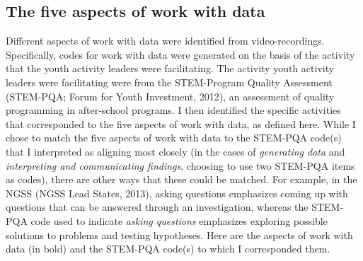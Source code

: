 \documentclass[]{msu-thesis}
\theoremstyle{definition}
\theoremstyle{definition}
\theoremstyle{definition}
\theoremstyle{remark}
\begin{document}
\begin{table}

\caption{\label{tab:unnamed-chunk-3}ESM measures for profiles}
\centering
{}
\end{table}

\subsection{The five aspects of work with
data}\label{the-five-aspects-of-work-with-data}

Different aspects of work with data were identified from
video-recordings. Specifically, codes for work with data were generated
on the basis of the activity that the youth activity leaders were
facilitating. The activity youth activity leaders were facilitating were
from the STEM-Program Quality Assessment (STEM-PQA; Forum for Youth
Investment, 2012), an assessment of quality programming in after-school
programs. I then identified the specific activities that corresponded to
the five aspects of work with data, as defined here. While I chose to
match the five aspects of work with data to the STEM-PQA code(s) that I
interpreted as aligning most closely (in the cases of \emph{generating
data} and \emph{interpreting and communicating findings}, choosing to
use two STEM-PQA items as codes), there are other ways that these could
be matched. For example, in the NGSS (NGSS Lead States, 2013), asking
questions emphasizes coming up with questions that can be answered
through an investigation, whereas the STEM-PQA code used to indicate
\emph{asking questions} emphasizes exploring possible solutions to
problems and testing hypotheses. Here are the aspects of work with data
(in bold) and the STEM-PQA code(s) to which I corresponded them.
\end{document}
